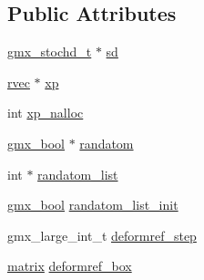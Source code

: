 \subsection*{\-Public \-Attributes}
\begin{DoxyCompactItemize}
\item 
\hyperlink{structgmx__stochd__t}{gmx\-\_\-stochd\-\_\-t} $\ast$ \hyperlink{structgmx__update_a0a4e6ade92e967c8790e2d607056b6dd}{sd}
\item 
\hyperlink{share_2template_2gromacs_2types_2simple_8h_aa02a552a4abd2f180c282a083dc3a999}{rvec} $\ast$ \hyperlink{structgmx__update_a89b863b8be52ee7b33416fae7e5765d1}{xp}
\item 
int \hyperlink{structgmx__update_a534799aa80e6e0d16f2678f717f74312}{xp\-\_\-nalloc}
\item 
\hyperlink{include_2types_2simple_8h_a8fddad319f226e856400d190198d5151}{gmx\-\_\-bool} $\ast$ \hyperlink{structgmx__update_aa0c769bb872c45822f20aa9f09259e72}{randatom}
\item 
int $\ast$ \hyperlink{structgmx__update_ab2e7e59d117590dc3e24ed914f0f7022}{randatom\-\_\-list}
\item 
\hyperlink{include_2types_2simple_8h_a8fddad319f226e856400d190198d5151}{gmx\-\_\-bool} \hyperlink{structgmx__update_a6a4ba367ca083bba3982d8b8b5e6aa75}{randatom\-\_\-list\-\_\-init}
\item 
gmx\-\_\-large\-\_\-int\-\_\-t \hyperlink{structgmx__update_a10fec30459ada4eef2f99368aec9aff8}{deformref\-\_\-step}
\item 
\hyperlink{share_2template_2gromacs_2types_2simple_8h_a7ea9c2a830d3f743b887387e33645a83}{matrix} \hyperlink{structgmx__update_a3f55e60aff1c914f7c8c0d8c92f274e7}{deformref\-\_\-box}
\end{DoxyCompactItemize}


